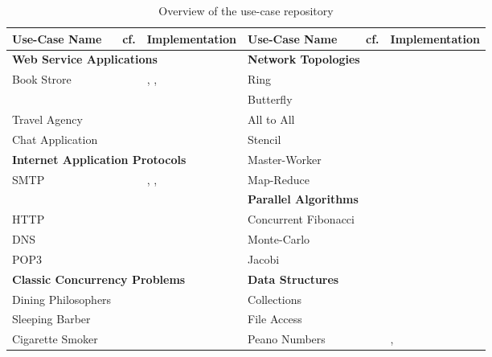 \begin{table}[!h]
\begin{center}
\begin{tabular}{|l|l|l|l|l|l|}
	\hline
	Use-Case Name & cf. & Implementation
	&
	Use-Case Name & cf. & Implementation
	\\

	\hline
	\hline
	\multicolumn{3}{|l|}{ \textbf{Web Service Applications}}
	&
	\multicolumn{3}{|l|}{ \textbf{Network Topologies}}
	\\
	\hline
	Book Strore & \cite{W3C} & \SJ, \Mungo,
	&
	Ring & \cite{BerkleyPar} & \MPI	
	\\
	& & \JavaAPI
	&
	Butterfly & \cite{BerkleyPar} & \MPI
	\\
	Travel Agency & \cite{W3C} & \SJ
	&
	All to All & \cite{BerkleyPar} & \MPI	
	\\
	Chat Application & \cite{SF15} & \Erlang
	&
	Stencil & \cite{BerkleyPar} & \MPI
	\\

	\cline{1-3}
	\cline{1-3}
	\multicolumn{3}{|l|}{ \textbf{Internet Application Protocols}}
	&
	Master-Worker & \cite{BerkleyPar} & \MPI
	\\
	\cline{1-3}
	SMTP & \cite{RFC} & \Mungo, \Links,
	&
	Map-Reduce & \cite{BerkleyPar} & \MPI
	\\
	\cline{4-6}
	\cline{4-6}
	&&\JavaAPI
	&
	\multicolumn{3}{|l|}{ \textbf{Parallel Algorithms}}
	\\
	\cline{4-6}
	HTTP & \cite{RFC} & \JavaAPI
	&
	Concurrent Fibonacci &  & \Mungo
	\\
	DNS & \cite{RFC} & \Erlang
	&
	Monte-Carlo & \cite{book:using-mpi} & \MPI
	\\
	POP3 & \cite{RFC} & \Mungo
	&
	Jacobi & \cite{book:using-mpi} & \MPI
	\\

	\hline
	\multicolumn{3}{|l|}{ \textbf{Classic Concurrency Problems}}
	&
	\multicolumn{3}{|l|}{ \textbf{Data Structures}}
	\\
	\hline
	Dining Philosophers & \cite{Savina} & \SPython
	&
	Collections & \cite{mungo} & \Mungo
	\\
	Sleeping Barber & \cite{Savina} & \SPython
	&
	File Access & \cite{mungo} & \Mungo
	\\
	Cigarette Smoker & \cite{Savina} & \SPython
	&
	Peano Numbers & \cite{citation_needed} & \GV, \Links
	\\
	\hline
\end{tabular}
\end{center}
\caption{Overview of the use-case repository}
\label{table:use_cases_all}
\vspace{-10mm}
\end{table}

